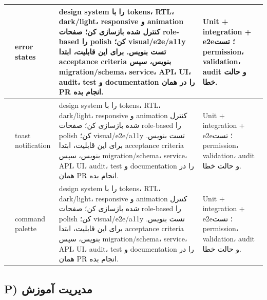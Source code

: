 \documentclass[11pt,a4paper]{article}
\begin{document}
\begin{longtable}{|>{\raggedleft\arraybackslash}p{}|>{\raggedleft\arraybackslash}p{}|>{\raggedleft\arraybackslash}p{}|>{\raggedleft\arraybackslash}p{}|}
278 & error states & design system را با tokens، RTL، dark/light، responsive و animation کنترل شده بازسازی کن؛ صفحات role-based را polish کن؛ visual/e2e/a11y تست بنویس. برای این قابلیت، ابتدا acceptance criteria بنویس، سپس migration/schema، service، API، UI، audit، test و documentation را در همان PR انجام بده. & Unit + integration + e2e؛ تست permission، validation، audit و حالت خطا. \\ \hline
279 & toast notification & design system را با tokens، RTL، dark/light، responsive و animation کنترل شده بازسازی کن؛ صفحات role-based را polish کن؛ visual/e2e/a11y تست بنویس. برای این قابلیت، ابتدا acceptance criteria بنویس، سپس migration/schema، service، API، UI، audit، test و documentation را در همان PR انجام بده. & Unit + integration + e2e؛ تست permission، validation، audit و حالت خطا. \\ \hline
280 & command palette & design system را با tokens، RTL، dark/light، responsive و animation کنترل شده بازسازی کن؛ صفحات role-based را polish کن؛ visual/e2e/a11y تست بنویس. برای این قابلیت، ابتدا acceptance criteria بنویس، سپس migration/schema، service، API، UI، audit، test و documentation را در همان PR انجام بده. & Unit + integration + e2e؛ تست permission، validation، audit و حالت خطا. \\ \hline
\end{longtable}
\subsection{P) مدیریت آموزش}
\end{document}
